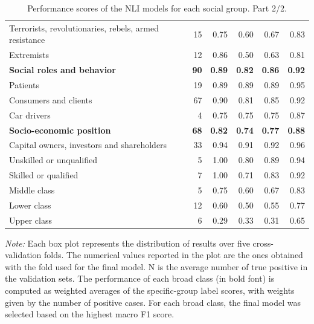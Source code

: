 \begin{table}[htb]
\begin{tabular}{l r r r r r}
\quad Terrorists, revolutionaries, rebels, armed resistance & 15 & 0.75 & 0.60 & 0.67 & 0.83 \\
\quad Extremists & 12 & 0.86 & 0.50 & 0.63 & 0.81 \\
\addlinespace
\textbf{Social roles and behavior} & \textbf{90} & \textbf{0.89} & \textbf{0.82} & \textbf{0.86} & \textbf{0.92} \\
\quad Patients & 19 & 0.89 & 0.89 & 0.89 & 0.95 \\
\quad Consumers and clients & 67 & 0.90 & 0.81 & 0.85 & 0.92 \\
\quad Car drivers & 4 & 0.75 & 0.75 & 0.75 & 0.87 \\
\addlinespace
\textbf{Socio-economic position} & \textbf{68} & \textbf{0.82} & \textbf{0.74} & \textbf{0.77} & \textbf{0.88} \\
\quad Capital owners, investors and shareholders & 33 & 0.94 & 0.91 & 0.92 & 0.96 \\
\quad Unskilled or unqualified & 5 & 1.00 & 0.80 & 0.89 & 0.94 \\
\quad Skilled or qualified & 7 & 1.00 & 0.71 & 0.83 & 0.92 \\
\quad Middle class & 5 & 0.75 & 0.60 & 0.67 & 0.83 \\
\quad Lower class & 12 & 0.60 & 0.50 & 0.55 & 0.77 \\
\quad Upper class & 6 & 0.29 & 0.33 & 0.31 & 0.65 \\
\bottomrule
\end{tabular}
\par\vspace{0.15cm}
\begin{minipage}{0.9\linewidth}
\footnotesize
\textit{Note:} Each box plot represents the distribution of results over five cross-validation folds. The numerical values reported in the plot are the ones obtained with the fold used for the final model. N is the average number of true positive in the validation sets. The performance of each broad class (in bold font) is computed as weighted averages of the specific-group label scores, with weights given by the number of positive cases. For each broad class, the final model was selected based on the highest macro F1 score.
\end{minipage}
\caption{Performance scores of the NLI models for each social group. Part 2/2.}
\label{tab:step2_best_fold_metrics_2}
\end{table}